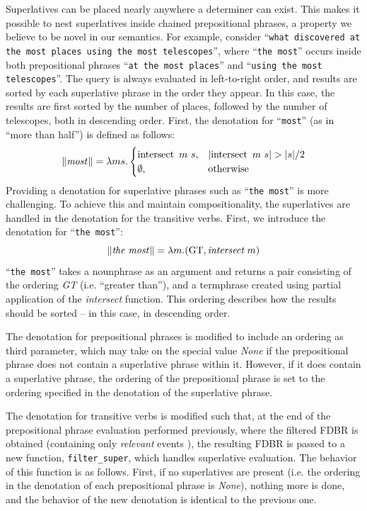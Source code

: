 \documentclass[../main.tex]{subfiles}
\begin{document}
\begin{refsection}
Superlatives can be placed nearly anywhere a determiner can exist.
This makes it possible to nest superlatives inside chained prepositional phrases, a property we believe to be novel in our semantics.  For example, consider ``\texttt{what discovered at the most places using the most telescopes}'', where ``\texttt{the most}'' occurs inside both prepositional phrases ``\texttt{at the most places}'' and ``\texttt{using the most telescopes}''.  The query is always evaluated in left-to-right order, and results are sorted by each superlative phrase in the order they appear. In this case, the results are first sorted by the number of places, followed by the number of telescopes, both in descending order.
First, the denotation for ``\texttt{most}'' (as in ``more than half'') is defined as follows:
\begin{equation*}
	\lVert\textit{most\hspace{0.1em}}\rVert = \lambda ms.
	\begin{cases}
		\operatorname{intersect}\ m\ s, & \lvert\operatorname{intersect}\ m\ s\rvert > \lvert{s}\rvert/2 \\
		\emptyset, & \text{otherwise}
	\end{cases}
\end{equation*}
Providing a denotation for superlative phrases such as ``\texttt{the most}'' is more challenging. To achieve this and maintain compositionality, the superlatives are handled in the denotation for the transitive verbs.
First, we introduce the denotation for ``\texttt{the most}'':
\begin{equation*}
	\lVert\textit{the\ most\hspace{0.1em}}\rVert = \lambda m.(\text{GT}, \textit{intersect}\ m)
\end{equation*}
``\texttt{the most}'' takes a nounphrase as an argument and returns a pair consisting of the ordering \textit{GT} (i.e. ``greater than''), and a termphrase created using partial application of the \textit{intersect} function.  This ordering describes how the results should be sorted -- in this case, in descending order.

The denotation for prepositional phrases is modified to include an ordering as third parameter, which may take on the special value \textit{None} if the prepositional phrase does not contain a superlative phrase within it.  However, if it does contain a superlative phrase, the ordering of the prepositional phrase is set to the ordering specified in the denotation of the superlative phrase.

The denotation for transitive verbs is modified such that, at the end of the prepositional phrase evaluation performed previously, where the filtered FDBR is obtained (containing only {\em relevant} events \cite{peelar2016accommodating}), the resulting FDBR is passed to a new function, \texttt{filter\_super}, which handles superlative evaluation.  The behavior of this function is as follows.  First, if no superlatives are present (i.e. the ordering in the denotation of each prepositional phrase is \textit{None}), nothing more is done, and the behavior of the new denotation is identical to the previous one.


\end{refsection}
\end{document}

